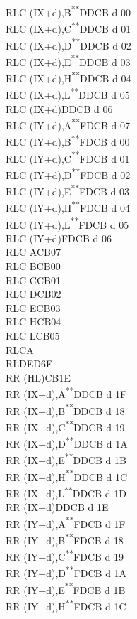 \documentclass[twoside,openright,a4paper]{book}
\newcommand{\UNDOC}{\textnormal{\textsuperscript{**}}}
\begin{document}
\begin{multicols}{3}
{\begin{tabbing}
	RLC (IX+d),B\UNDOC\>DDCB d 00\\
	RLC (IX+d),C\UNDOC\>DDCB d 01\\
	RLC (IX+d),D\UNDOC\>DDCB d 02\\
	RLC (IX+d),E\UNDOC\>DDCB d 03\\
	RLC (IX+d),H\UNDOC\>DDCB d 04\\
	RLC (IX+d),L\UNDOC\>DDCB d 05\\
	RLC (IX+d)\>DDCB d 06\\
	RLC (IY+d),A\UNDOC\>FDCB d 07\\
	RLC (IY+d),B\UNDOC\>FDCB d 00\\
	RLC (IY+d),C\UNDOC\>FDCB d 01\\
	RLC (IY+d),D\UNDOC\>FDCB d 02\\
	RLC (IY+d),E\UNDOC\>FDCB d 03\\
	RLC (IY+d),H\UNDOC\>FDCB d 04\\
	RLC (IY+d),L\UNDOC\>FDCB d 05\\
	RLC (IY+d)\>FDCB d 06\\
	RLC A\>CB07\\
	RLC B\>CB00\\
	RLC C\>CB01\\
	RLC D\>CB02\\
	RLC E\>CB03\\
	RLC H\>CB04\\
	RLC L\>CB05\\
	RLCA\\
	RLD\>ED6F\\
	RR (HL)\>CB1E\\
	RR (IX+d),A\UNDOC\>DDCB d 1F\\
	RR (IX+d),B\UNDOC\>DDCB d 18\\
	RR (IX+d),C\UNDOC\>DDCB d 19\\
	RR (IX+d),D\UNDOC\>DDCB d 1A\\
	RR (IX+d),E\UNDOC\>DDCB d 1B\\
	RR (IX+d),H\UNDOC\>DDCB d 1C\\
	RR (IX+d),L\UNDOC\>DDCB d 1D\\
	RR (IX+d)\>DDCB d 1E\\
	RR (IY+d),A\UNDOC\>FDCB d 1F\\
	RR (IY+d),B\UNDOC\>FDCB d 18\\
	RR (IY+d),C\UNDOC\>FDCB d 19\\
	RR (IY+d),D\UNDOC\>FDCB d 1A\\
	RR (IY+d),E\UNDOC\>FDCB d 1B\\
	RR (IY+d),H\UNDOC\>FDCB d 1C\\

\end{tabbing}}
\end{multicols}
\end{document}

